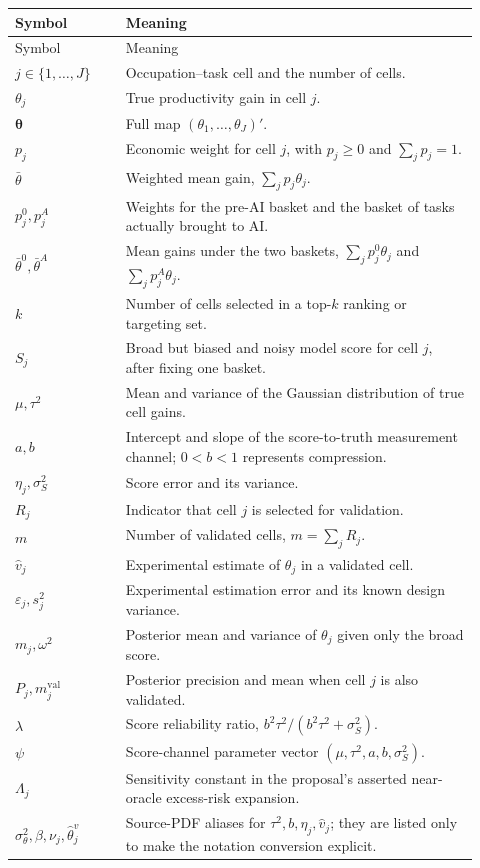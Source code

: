 \documentclass[11pt]{article}
\newcommand{\thetav}{\boldsymbol{\theta}}
\begin{document}
  \begin{longtable}{>{\raggedright\arraybackslash}p{0.22\linewidth}
                    >{\raggedright\arraybackslash}p{0.70\linewidth}}
  \toprule
  Symbol & Meaning \\
  \midrule
  \endfirsthead
  \toprule
  Symbol & Meaning \\
  \midrule
  \endhead
  \(j\in\{1,\ldots,J\}\) & Occupation--task cell and the number of cells. \\
  \(\theta_j\) & True productivity gain in cell \(j\). \\
  \(\thetav\) & Full map \((\theta_1,\ldots,\theta_J)'\). \\
  \(p_j\) & Economic weight for cell \(j\), with
  \(p_j\geq 0\) and \(\sum_j p_j=1\). \\
  \(\bar\theta\) & Weighted mean gain, \(\sum_jp_j\theta_j\). \\
  \(p_j^0,p_j^A\) & Weights for the pre-AI basket and the basket of tasks
  actually brought to AI. \\
  \(\bar\theta^0,\bar\theta^A\) & Mean gains under the two baskets,
  \(\sum_jp_j^0\theta_j\) and \(\sum_jp_j^A\theta_j\). \\
  \(k\) & Number of cells selected in a top-\(k\) ranking or targeting set. \\
  \(S_j\) & Broad but biased and noisy model score for cell \(j\), after fixing
  one basket. \\
  \(\mu,\tau^2\) & Mean and variance of the Gaussian distribution of
  true cell gains. \\
  \(a,b\) & Intercept and slope of the score-to-truth measurement channel;
  \(0<b<1\) represents compression. \\
  \(\eta_j,\sigma_S^2\) & Score error and its variance. \\
  \(R_j\) & Indicator that cell \(j\) is selected for validation. \\
  \(m\) & Number of validated cells, \(m=\sum_jR_j\). \\
  \(\widehat v_j\) & Experimental estimate of \(\theta_j\) in a validated
  cell. \\
  \(\varepsilon_j,s_j^2\) & Experimental estimation error and its known design
  variance. \\
  \(m_j,\omega^2\) & Posterior mean and variance of \(\theta_j\) given only
  the broad score. \\
  \(P_j,m_j^{\mathrm{val}}\) & Posterior precision and mean when cell \(j\)
  is also validated. \\
  \(\lambda\) & Score reliability ratio,
  \(b^2\tau^2/(b^2\tau^2+\sigma_S^2)\). \\
  \(\psi\) & Score-channel parameter vector
  \((\mu,\tau^2,a,b,\sigma_S^2)\). \\
  \(\Lambda_j\) & Sensitivity constant in the proposal's asserted
  near-oracle excess-risk expansion. \\
  \(\sigma_\theta^2,\beta,\nu_j,\widehat\theta_j^v\) & Source-PDF aliases for
  \(\tau^2,b,\eta_j,\widehat v_j\); they are listed only to make the notation
  conversion explicit. \\
  \bottomrule
  \end{longtable}
  
\end{document}
